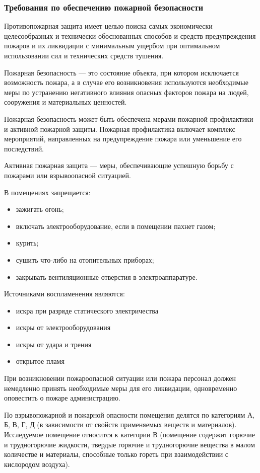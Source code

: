 \subsubsection{Требования по обеспечению пожарной безопасности}

Противопожарная защита имеет целью поиска самых экономически целесообразных и технически обоснованных способов и средств предупреждения пожаров и их ликвидации с минимальным ущербом при оптимальном использовании сил и технических средств тушения.

Пожарная безопасность --- это состояние объекта, при котором исключается возможность пожара, а в случае его возникновения используются необходимые меры по устранению негативного влияния опасных факторов пожара на людей, сооружения и материальных ценностей.

Пожарная безопасность может быть обеспечена мерами пожарной профилактики и активной пожарной защиты.
Пожарная профилактика включает комплекс мероприятий, направленных на предупреждение пожара или уменьшение его последствий.

Активная пожарная защита --- меры, обеспечивающие успешную борьбу с пожарами или взрывоопасной ситуацией.

В помещениях запрещается:
\begin{itemize}
  \item зажигать огонь;
  \item включать электрооборудование, если в помещении пахнет газом;
  \item курить;
  \item сушить что-либо на отопительных приборах;
  \item закрывать вентиляционные отверстия в электроаппаратуре.
\end{itemize}

Источниками воспламенения являются:
\begin{itemize}
  \item искра при разряде статического электричества
  \item искры от электрооборудования
  \item искры от удара и трения
  \item открытое пламя
\end{itemize}

При возникновении пожароопасной ситуации или пожара персонал должен немедленно принять необходимые меры для его ликвидации, одновременно оповестить о пожаре администрацию.

По взрывопожарной и пожарной опасности помещения делятся по категориям А, Б, В, Г, Д (в зависимости от свойств применяемых веществ и материалов). Исследуемое  помещение относится к категории В (помещение содержит горючие и трудногорючие жидкости, твердые горючие и трудногорючие вещества в малом количестве и материалы, способные только гореть при взаимодействии с кислородом воздуха).

